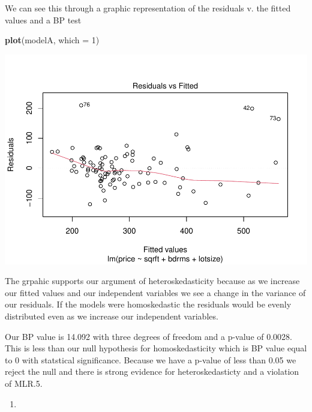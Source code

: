 \documentclass[
  12pt,
  landscape]{article}
\newenvironment{Shaded}{\begin{snugshade}}{\end{snugshade}}
\newcommand{\DataTypeTok}[1]{\textcolor[rgb]{0.13,0.29,0.53}{#1}}
\newcommand{\DecValTok}[1]{\textcolor[rgb]{0.00,0.00,0.81}{#1}}
\newcommand{\KeywordTok}[1]{\textcolor[rgb]{0.13,0.29,0.53}{\textbf{#1}}}
\newcommand{\NormalTok}[1]{#1}
\begin{document}
We can see this through a graphic representation of the residuals v. the
fitted values and a BP test

\begin{Shaded}
\begin{Highlighting}[]
\KeywordTok{plot}\NormalTok{(modelA, }\DataTypeTok{which =} \DecValTok{1}\NormalTok{)}
\end{Highlighting}
\end{Shaded}

\includegraphics{Ogle_MicroMetricsAssignment_2_Q1_files/figure-latex/unnamed-chunk-18-1.pdf}

The grpahic supports our argument of heteroskedasticity because as we
increase our fitted values and our independent variables we see a change
in the variance of our residuals. If the models were homoskedastic the
residuals would be evenly distributed even as we increase our
independent variables.

Our BP value is 14.092 with three degrees of freedom and a p-value of
0.0028. This is less than our null hypothesis for homoskedasticity which
is BP value equal to 0 with statstical significance. Because we have a
p-value of less than 0.05 we reject the null and there is strong
evidence for heteroskedasticty and a violation of MLR.5.

\begin{enumerate}
\def\labelenumi{(\roman{enumi})}
\item
\end{enumerate}
\end{document}
